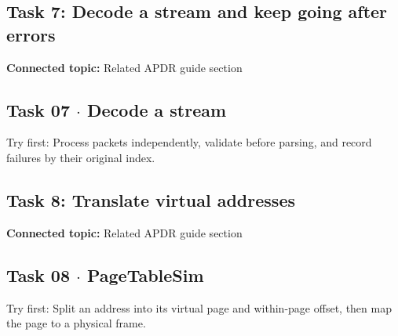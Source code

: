 \documentclass[11pt]{article}
\begin{document}
\begin{keepsection}
\section{Task 7: Decode a stream and keep going after errors}

\textbf{Connected topic:} Related APDR guide section

\begin{keepsection}
\subsection{Task 07 \ensuremath{\cdot} Decode a stream}

Try first: Process packets independently, validate before parsing, and record failures by their original index.

\end{keepsection}
\end{keepsection}

\begin{keepsection}
\section{Task 8: Translate virtual addresses}

\textbf{Connected topic:} Related APDR guide section

\begin{keepsection}
\subsection{Task 08 \ensuremath{\cdot} PageTableSim}

Try first: Split an address into its virtual page and within-page offset, then map the page to a physical frame.

\end{keepsection}
\end{keepsection}
\end{document}
